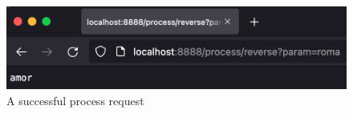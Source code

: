 \begin{figure}[h]
\centering
\includegraphics[scale=0.6]{images/part1Success}
\caption{A successful process request}
\label{fig:01_part1_impl_success}
\end{figure}
